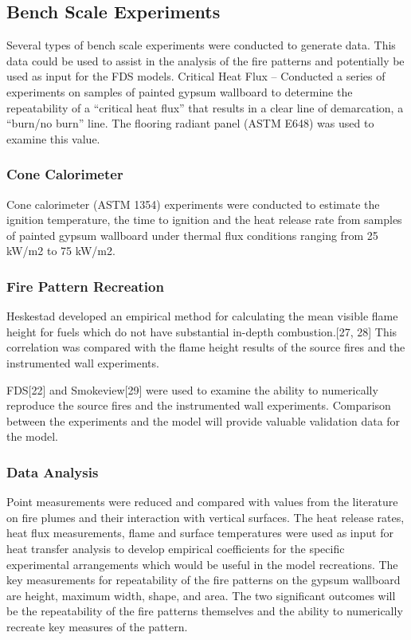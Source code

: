 \documentclass[twoside]{uocthesis}
\begin{document}
\subsection{Bench Scale Experiments}

Several types of bench scale experiments were conducted to generate data. This data could be used to assist in the analysis of the fire patterns and potentially be used as input for the FDS models.
Critical Heat Flux – Conducted a series of experiments on samples of painted gypsum wallboard to determine the repeatability of a “critical heat flux” that results in a clear line of demarcation, a “burn/no burn” line.  The flooring radiant panel (ASTM E648) was used to examine this value. 
 
\subsubsection{Cone Calorimeter}

Cone calorimeter (ASTM 1354) experiments were conducted to estimate the ignition temperature, the time to ignition and the heat release rate from samples of painted gypsum wallboard under thermal flux conditions ranging from 25 kW/m2 to 75 kW/m2.

\subsubsection{Fire Pattern Recreation}

Heskestad developed an empirical method for calculating the mean visible flame height for fuels which do not have substantial in-depth combustion.[27, 28] This correlation was compared with the flame height results of the source fires and the instrumented wall experiments.

FDS[22] and Smokeview[29] were used to examine the ability to numerically reproduce the source fires and the instrumented wall experiments.  Comparison between the experiments and the model will provide valuable validation data for the model.    

\subsubsection{Data Analysis}

Point measurements were reduced and compared with values from the literature on fire plumes and their interaction with vertical surfaces.  The heat release rates, heat flux measurements, flame and surface temperatures were used as input for heat transfer analysis to develop empirical coefficients for the specific experimental arrangements which would be useful in the model recreations.
The key measurements for repeatability of the fire patterns on the gypsum wallboard are height, maximum width, shape, and area.  The two significant outcomes will be the repeatability of the fire patterns themselves and the ability to numerically recreate key measures of the pattern.
\end{document}
